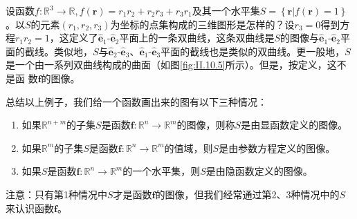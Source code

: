 \documentclass[main.tex]{subfiles}
\begin{document}
\begin{example}\label{exp:II.10.6}
设函数$f:\mathbb{R}^3\rightarrow\mathbb{R},f\left(\mathbf{r}\right)=r_1r_2+r_2r_3+r_3r_1$及其一个水平集$S=\left\{\mathbf{r}|f\left(\mathbf{r}\right)=1\right\}$。以$S$的元素$\left(r_1,r_2,r_3\right)$为坐标的点集构成的三维图形是怎样的？设$r_3=0$得到方程$r_1r_2=1$，这定义了$\mathbf{\hat{e}}_1$-$\mathbf{\hat{e}}_2$平面上的一条双曲线，这条双曲线是$S$的图像与$\mathbf{\hat{e}}_1$-$\mathbf{\hat{e}}_2$平面的截线。类似地，$S$与$\mathbf{\hat{e}}_2$-$\mathbf{\hat{e}}_3$、$\mathbf{\hat{e}}_1$-$\mathbf{\hat{e}}_3$平面的截线也是类似的双曲线。更一般地，$S$是一个由一系列双曲线构成的曲面（如图\ref{fig:II.10.5}所示）。但是，按定义，这不是函
数$\mathbf{f}$的图像。
\end{example}

总结以上例子，我们给一个函数画出来的图有以下三种情况：

\begin{enumerate}
\item 如果$\mathbb{R}^{n+m}$的子集$S$是函数$\mathbf{f}:\mathbb{R}^n\rightarrow\mathbb{R}^m$的图像，则称$S$是由显函数定义的图像。
\item 如果$\mathbb{R}^{m}$的子集$S$是函数$\mathbf{f}:\mathbb{R}^n\rightarrow\mathbb{R}^m$的值域，则$S$是由参数方程定义的图像。
\item 如果$S$是函数$\mathbf{f}:\mathbb{R}^n\rightarrow\mathbb{R}^m$的一个水平集，则$S$是由隐函数定义的图像。
\end{enumerate}

注意：只有第1种情况中$S$才是函数$\mathbf{f}$的图像，但我们经常通过第2、3种情况中的$S$来认识函数$\mathbf{f}$。
\end{document}
